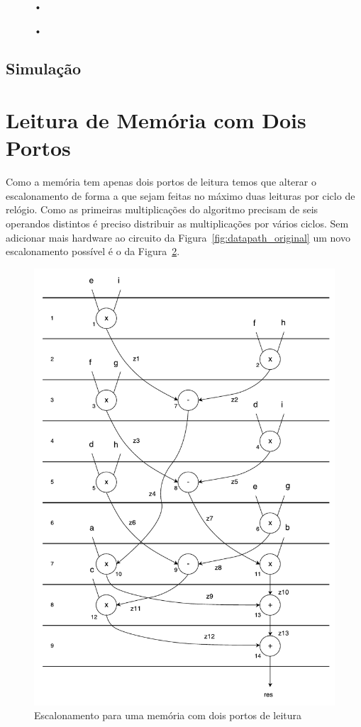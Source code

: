 \documentclass[a4paper]{article}
\begin{document}
\begin{figure}[h]
	\centering
	•
	\caption{•}
	\label{fig:statemachine}
\end{figure}

\subsection{Simulação}

\section{Leitura de Memória com Dois Portos}
\label{sec:leitura_mem_2portos}

Como a memória tem apenas dois portos de leitura temos que alterar o escalonamento de forma a que sejam feitas no máximo duas leituras por ciclo de relógio. Como as primeiras multiplicações do algoritmo precisam de seis operandos distintos é preciso distribuir as multiplicações por vários ciclos. Sem adicionar mais hardware ao circuito da Figura~\ref{fig:datapath_original} um novo escalonamento possível é o da Figura~\ref{fig:scheduling_2portRAM_basic}.

\begin{figure}[h]
	\centering
	\includegraphics[width=\linewidth]{scheduling_2portRAM_basic}
	\caption{Escalonamento para uma memória com dois portos de leitura}
	\label{fig:scheduling_2portRAM_basic}
\end{figure}
\end{document}
